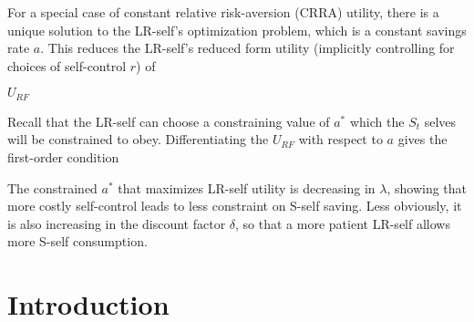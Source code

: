 \documentclass{article}
\begin{document}
For a special case of constant relative risk-aversion  (CRRA) utility, there is a unique solution to the LR-self’s optimization problem, which is a constant savings rate $a$. This reduces the LR-self’s reduced form utility (implicitly controlling for choices of self-control $r$) of  

$U_{RF}$
 
Recall that the LR-self can choose a constraining value of $a^*$ which the $S_t$ selves will be constrained to obey. Differentiating the $U_{RF}$ with respect to $a$ gives the first-order condition 
 
The constrained $a^*$ that maximizes LR-self utility is decreasing in $\lambda$, showing that more costly self-control leads to less constraint on S-self saving. Less obviously, it is also increasing in the discount factor $\delta$, so that a more patient LR-self allows more S-self consumption. 

\section{Introduction}
\end{document}
